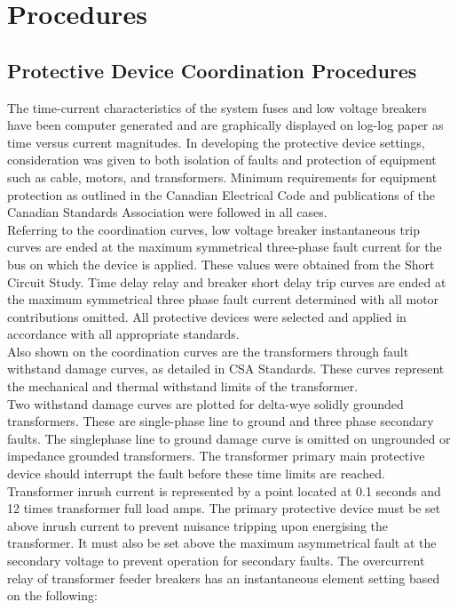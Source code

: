 \section{Procedures}
\label{af:p}

\subsection{Protective Device Coordination Procedures}
\label{af:p:afsp}

The time-current characteristics of the system fuses and low voltage breakers have
been computer generated and are graphically displayed on log-log paper as time
versus current magnitudes. In developing the protective device settings, consideration
was given to both isolation of faults and protection of equipment such as cable, motors,
and transformers. Minimum requirements for equipment protection as outlined in the
Canadian Electrical Code and publications of the Canadian Standards Association were
followed in all cases.\\

Referring to the coordination curves, low voltage breaker instantaneous trip curves are
ended at the maximum symmetrical three-phase fault current for the bus on which the
device is applied. These values were obtained from the Short Circuit Study. Time
delay relay and breaker short delay trip curves are ended at the maximum symmetrical
three phase fault current determined with all motor contributions omitted. All protective
devices were selected and applied in accordance with all appropriate standards.\\

Also shown on the coordination curves are the transformers through fault withstand
damage curves, as detailed in CSA Standards. These curves represent the
mechanical and thermal withstand limits of the transformer.\\


Two withstand damage curves are plotted for delta-wye solidly grounded transformers.
These are single-phase line to ground and three phase secondary faults. The singlephase
line to ground damage curve is omitted on ungrounded or impedance grounded
transformers. The transformer primary main protective device should interrupt the fault
before these time limits are reached.\\

Transformer inrush current is represented by a point located at 0.1 seconds and 12
times transformer full load amps. The primary protective device must be set above
inrush current to prevent nuisance tripping upon energising the transformer. It must
also be set above the maximum asymmetrical fault at the secondary voltage to prevent
operation for secondary faults. The overcurrent relay of transformer feeder breakers
has an instantaneous element setting based on the following:\\


